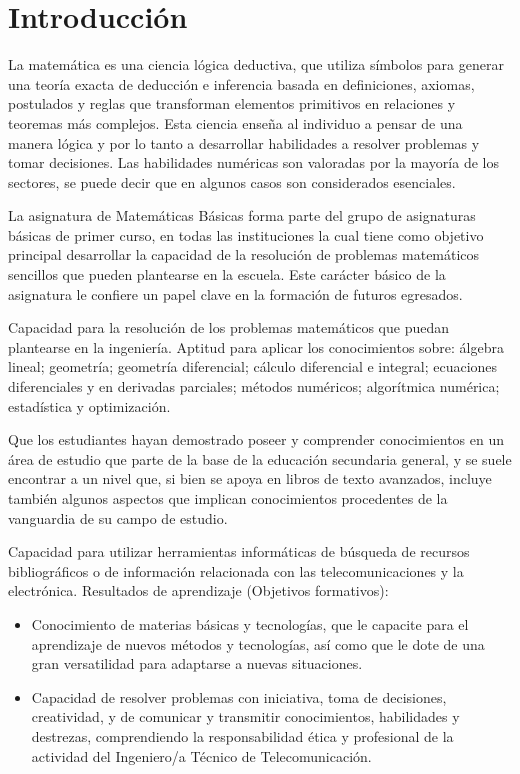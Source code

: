 \documentclass[
  16pt,
]{krantz}
\providecommand{\tightlist}{%
  \setlength{\itemsep}{0pt}\setlength{\parskip}{0pt}}
\theoremstyle{definition}
\theoremstyle{definition}
\theoremstyle{definition}
\theoremstyle{definition}
\theoremstyle{remark}
\begin{document}
\hypertarget{introducciuxf3n}{%
\chapter*{Introducción}\label{introducciuxf3n}}


La matemática es una ciencia lógica deductiva, que utiliza símbolos para generar una teoría exacta de deducción e inferencia basada en definiciones, axiomas, postulados y reglas que transforman elementos primitivos en relaciones y teoremas más complejos. Esta ciencia enseña al individuo a pensar de una manera lógica y por lo tanto a desarrollar habilidades a resolver problemas y tomar decisiones. Las habilidades numéricas son valoradas por la mayoría de los sectores, se puede decir que en algunos casos son considerados esenciales.

La asignatura de Matemáticas Básicas forma parte del grupo de asignaturas básicas de primer curso, en todas las instituciones la cual tiene como objetivo principal desarrollar la capacidad de la resolución de problemas matemáticos sencillos que pueden plantearse en la escuela. Este carácter básico de la asignatura le confiere un papel clave en la formación de futuros egresados.

Capacidad para la resolución de los problemas matemáticos que puedan plantearse en la ingeniería. Aptitud para aplicar los conocimientos sobre: álgebra lineal; geometría; geometría diferencial; cálculo diferencial e integral; ecuaciones diferenciales y en derivadas parciales; métodos numéricos; algorítmica numérica; estadística y optimización.

Que los estudiantes hayan demostrado poseer y comprender conocimientos en un área de estudio que parte de la base de la educación secundaria general, y se suele encontrar a un nivel que, si bien se apoya en libros de texto avanzados, incluye también algunos aspectos que implican conocimientos procedentes de la vanguardia de su campo de estudio.

Capacidad para utilizar herramientas informáticas de búsqueda de recursos bibliográficos o de información relacionada con las telecomunicaciones y la electrónica. Resultados de aprendizaje (Objetivos formativos):

\begin{itemize}
\tightlist
\item
  Conocimiento de materias básicas y tecnologías, que le capacite para el aprendizaje de nuevos métodos y tecnologías, así como que le dote de una gran versatilidad para adaptarse a nuevas situaciones.
\item
  Capacidad de resolver problemas con iniciativa, toma de decisiones, creatividad, y de comunicar y transmitir conocimientos, habilidades y destrezas, comprendiendo la responsabilidad ética y profesional de la actividad del Ingeniero/a Técnico de Telecomunicación.
\end{itemize}
\end{document}
